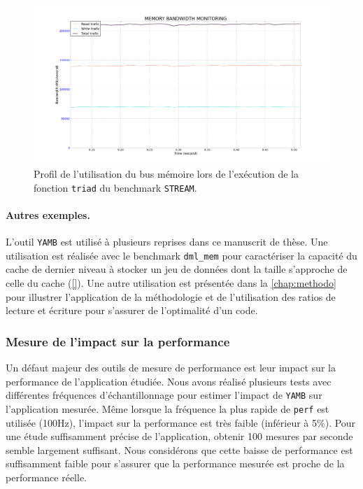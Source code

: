         
        \begin{figure}
        \center
        \includegraphics[width=14cm]{images/yamb_stream_triad.png}
        \caption{\label{pic:yamb_stream_triad} Profil de l'utilisation du bus mémoire lors de l'exécution de la fonction \texttt{triad} du benchmark \texttt{STREAM}.}
        \end{figure}


        \paragraph{Autres exemples.} L'outil \verb|YAMB| est utilisé à plusieurs reprises dans ce manuscrit de thèse. Une utilisation est réalisée avec le benchmark \verb=dml_mem= pour caractériser la capacité du cache de dernier niveau à stocker un jeu de données dont la taille s'approche de celle du cache (\autoref{}). Une autre utilisation est présentée dans la \autoref{chap:methodo} pour illustrer l'application de la méthodologie et de l'utilisation des ratios de lecture et écriture pour s'assurer de l'optimalité d'un code.
        
        

    \subsubsection{Mesure de l'impact sur la performance}
        Un défaut majeur des outils de mesure de performance est leur impact sur la performance de l'application étudiée. Nous avons réalisé plusieurs tests avec différentes fréquences d'échantillonnage pour estimer l'impact de \verb|YAMB| sur l'application mesurée. Même lorsque la fréquence la plus rapide de \verb=perf= est utilisée (100Hz), l'impact sur la performance est très faible (inférieur à 5\%). Pour une étude suffisamment précise de l'application, obtenir 100 mesures par seconde semble largement suffisant. Nous considérons que cette baisse de performance est suffisamment faible pour s'assurer que la performance mesurée est proche de la performance réelle.
        